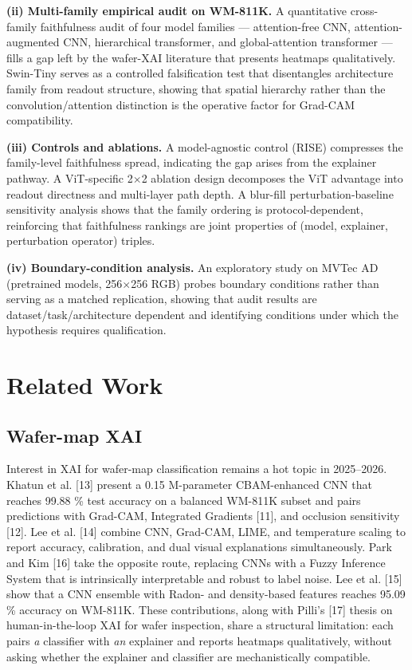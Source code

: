 \documentclass[11pt,a4paper]{article}
\begin{document}
\textbf{(ii) Multi-family empirical audit on WM-811K.} A quantitative cross-family faithfulness audit of four model families --- attention-free CNN, attention-augmented CNN, hierarchical transformer, and global-attention transformer --- fills a gap left by the wafer-XAI literature that presents heatmaps qualitatively. Swin-Tiny serves as a controlled falsification test that disentangles architecture family from readout structure, showing that spatial hierarchy rather than the convolution/attention distinction is the operative factor for Grad-CAM compatibility.

\textbf{(iii) Controls and ablations.} A model-agnostic control (RISE) compresses the family-level faithfulness spread, indicating the gap arises from the explainer pathway. A ViT-specific 2$\times$2 ablation design decomposes the ViT advantage into readout directness and multi-layer path depth. A blur-fill perturbation-baseline sensitivity analysis shows that the family ordering is protocol-dependent, reinforcing that faithfulness rankings are joint properties of (model, explainer, perturbation operator) triples.

\textbf{(iv) Boundary-condition analysis.} An exploratory study on MVTec AD (pretrained models, 256$\times$256 RGB) probes boundary conditions rather than serving as a matched replication, showing that audit results are dataset/task/architecture dependent and identifying conditions under which the hypothesis requires qualification.

\section{Related Work}

\subsection{Wafer-map XAI}

Interest in XAI for wafer-map classification remains a hot topic in 2025--2026. Khatun et al. [13] present a 0.15 M-parameter CBAM-enhanced CNN that reaches 99.88 \% test accuracy on a balanced WM-811K subset and pairs predictions with Grad-CAM, Integrated Gradients [11], and occlusion sensitivity [12]. Lee et al. [14] combine CNN, Grad-CAM, LIME, and temperature scaling to report accuracy, calibration, and dual visual explanations simultaneously. Park and Kim [16] take the opposite route, replacing CNNs with a Fuzzy Inference System that is intrinsically interpretable and robust to label noise. Lee et al. [15] show that a CNN ensemble with Radon- and density-based features reaches 95.09 \% accuracy on WM-811K. These contributions, along with Pilli's [17] thesis on human-in-the-loop XAI for wafer inspection, share a structural limitation: each pairs \emph{a} classifier with \emph{an}
explainer and reports heatmaps qualitatively, without asking whether the explainer and classifier are mechanistically compatible.
\end{document}
